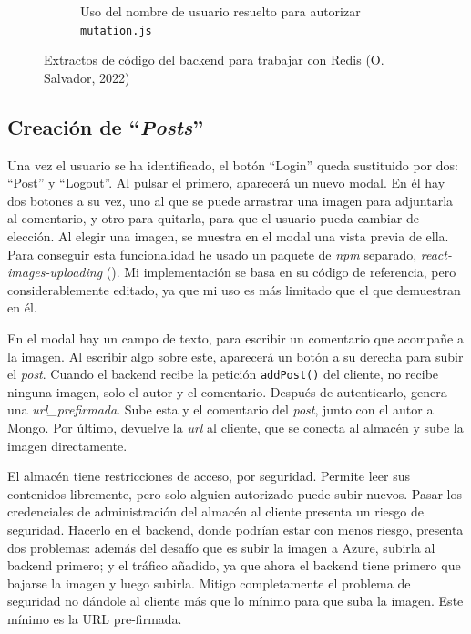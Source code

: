 \documentclass[11pt]{article}
\begin{document}
\begin{flushleft}
\begin{figure}[htb]
			\begin{subfigure}{.6\textwidth}
				\inputminted[fontsize=\scriptsize, firstline=57, lastline=61, linenos, frame=single, breaklines]{javascript}{../../backend/src/resolvers/mutation.js}
				\caption{Uso del nombre de usuario resuelto para autorizar \texttt{mutation.js}}
			\end{subfigure}
			
			\caption{Extractos de código del backend para trabajar con Redis (O. Salvador, 2022)}
			\label{extractos_redis}
		\end{figure}
  
  \bigskip
  \bigskip
  
	\subsection{Creación de ``\textit{Posts}''}
	Una vez el usuario se ha identificado, el botón ``Login'' queda sustituido por dos: ``Post'' y ``Logout''. Al pulsar el primero, aparecerá un nuevo modal. En él hay dos botones a su vez, uno al que se puede arrastrar una imagen para adjuntarla al comentario, y otro para quitarla, para que el usuario pueda cambiar de elección. Al elegir una imagen, se muestra en el modal una vista previa de ella.  Para conseguir esta funcionalidad he usado un paquete de \textit{\acrshort{npm}} separado, \textit{react-images-uploading} (\cite{react_imgs}). Mi implementación se basa en su código de referencia, pero considerablemente editado, ya que mi uso es más limitado que el que demuestran en él.
	\linebreak
	
	En el modal hay un campo de texto, para escribir un comentario que acompañe a la imagen. Al escribir algo sobre este, aparecerá un botón a su derecha para subir el \textit{post}. Cuando el backend recibe la petición \texttt{addPost()} del cliente, no recibe ninguna imagen, solo el autor y el comentario. Después de autenticarlo, genera una \textit{\gls{url_prefirmada}}. Sube esta y el comentario del \textit{post}, junto con el autor a Mongo. Por último, devuelve la \textit{\acrshort{url}} al cliente, que se conecta al almacén y sube la imagen directamente.
	\linebreak
	
	El almacén tiene restricciones de acceso, por seguridad. Permite leer sus contenidos libremente, pero solo alguien autorizado puede subir nuevos. Pasar los credenciales de administración del almacén al cliente presenta un riesgo de seguridad. Hacerlo en el backend, donde podrían estar con menos riesgo, presenta dos problemas: además del desafío que es subir la imagen a Azure, subirla al backend primero; y el tráfico añadido, ya que ahora el backend tiene primero que bajarse la imagen y luego subirla. Mitigo completamente el problema de seguridad no dándole al cliente más que lo mínimo para que suba la imagen. Este mínimo es la URL pre-firmada.
	\linebreak
	

\end{flushleft}
\end{document}
